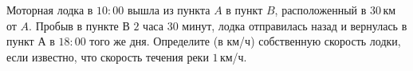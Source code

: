 \begin{exam}
\begin{listofex}
		\item Моторная лодка в \(10:00\) вышла из пункта \(A\) в пункт \(B\), расположенный в \(30\) км от \(A\). Пробыв в пункте В \(2\) часа \(30\) минут, лодка отправилась назад и вернулась в пункт А в \(18:00\) того же дня. Определите (в км/ч) собственную скорость лодки, если известно, что скорость течения реки \(1\) км/ч.
	\end{listofex}
\end{exam}
